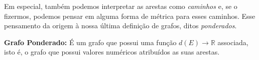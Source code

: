 \documentclass[a4paper,12pt]{article}
\begin{document}
Em especial, também podemos interpretar as arestas como \textit{caminhos} e, se o fizermos, podemos pensar em alguma forma de métrica para esses caminhos. Esse pensamento da origem à nossa última definição de grafos, ditos \textit{ponderados}.

\begin{center}
	\begin{minipage}{0.9 \linewidth}
		\textbf{Grafo Ponderado:} É um grafo que possui uma função $d(E) \rightarrow \mathbb{R}$ associada, isto é, o grafo que possui valores numéricos atribuídos as suas arestas.
	\end{minipage}
\end{center}

{}



\end{document}
